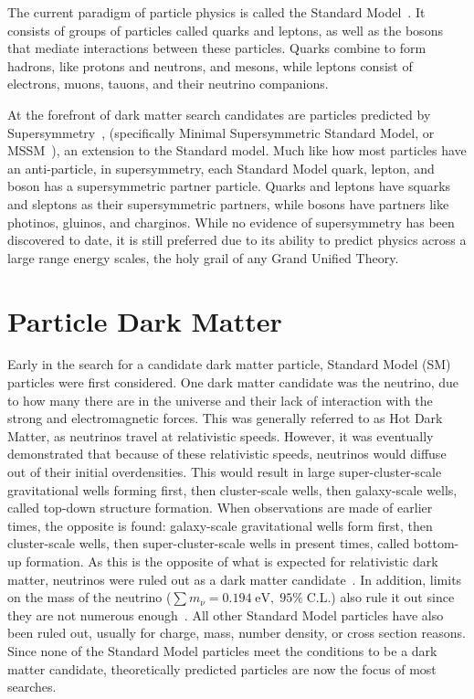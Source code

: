   The current paradigm of particle physics is called the Standard Model~\cite{standardmodel}.
  It consists of groups of particles called quarks and leptons, as well as the bosons that mediate interactions between these particles.
  Quarks combine to form hadrons, like protons and neutrons, and mesons, while leptons consist of electrons, muons, tauons, and their neutrino companions.

  At the forefront of dark matter search candidates are particles predicted by Supersymmetry~\cite{Jungman:1995df}, (specifically Minimal Supersymmetric Standard Model, or MSSM~\cite{MSSM,supersym1}), an extension to the Standard model.
  Much like how most particles have an anti-particle, in supersymmetry, each Standard Model quark, lepton, and boson has a supersymmetric partner particle.
  Quarks and leptons have squarks and sleptons as their supersymmetric partners, while bosons have partners like photinos, gluinos, and charginos.
  While no evidence of supersymmetry has been discovered to date, it is still preferred due to its ability to predict physics across a large range energy scales, the holy grail of any Grand Unified Theory.
  

\section{Particle Dark Matter}\label{sec_particledm}

  Early in the search for a candidate dark matter particle, Standard Model (SM) particles were first considered.
  One dark matter candidate was the neutrino, due to how many there are in the universe and their lack of interaction with the strong and electromagnetic forces.
  This was generally referred to as Hot Dark Matter, as neutrinos travel at relativistic speeds.
  However, it was eventually demonstrated that because of these relativistic speeds, neutrinos would diffuse out of their initial overdensities.
  This would result in large super-cluster-scale gravitational wells forming first, then cluster-scale wells, then galaxy-scale wells, called top-down structure formation.
  When observations are made of earlier times, the opposite is found: galaxy-scale gravitational wells form first, then cluster-scale wells, then super-cluster-scale wells in present times, called bottom-up formation.
  As this is the opposite of what is expected for relativistic dark matter, neutrinos were ruled out as a dark matter candidate~\cite{neutrinoHeirarchical}.
  In addition, limits on the mass of the neutrino ($\sum{}m_{\nu} = 0.194 \; \textrm{eV}, \; 95\% \; \textrm{C.L.}$) also rule it out since they are not numerous enough~\cite{planck2015}.
  All other Standard Model particles have also been ruled out, usually for charge, mass, number density, or cross section reasons.
  Since none of the Standard Model particles meet the conditions to be a dark matter candidate, theoretically predicted particles are now the focus of most searches.
  
